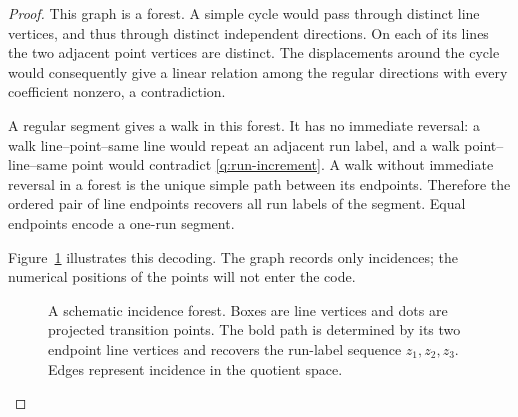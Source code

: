\begin{proof}
This graph is a forest.  A simple cycle would pass through distinct
line vertices, and thus through distinct independent directions.
On each of its lines the two adjacent point vertices are distinct.
The displacements around the cycle would consequently give a
linear relation among the regular directions with every coefficient
nonzero, a contradiction.

A regular segment gives a walk in this forest.  It has no immediate
reversal: a walk line--point--same line would repeat an adjacent run
label, and a walk point--line--same point would contradict
\eqref{q:run-increment}.  A walk without immediate reversal in a
forest is the unique simple path between its endpoints.  Therefore
the ordered pair of line endpoints recovers all run labels of the
segment.  Equal endpoints encode a one-run segment.

Figure~\ref{fig:q-forest-incidence} illustrates this decoding.  The
graph records only incidences; the numerical positions of the points
will not enter the code.
\begin{figure}[ht]
\centering
{}
\caption{A schematic incidence forest. Boxes are line vertices and dots
are projected transition points. The bold path is determined by its
two endpoint line vertices and recovers the run-label sequence
$z_1,z_2,z_3$. Edges represent incidence in the quotient space.}
\label{fig:q-forest-incidence}
\end{figure}


\end{proof}
